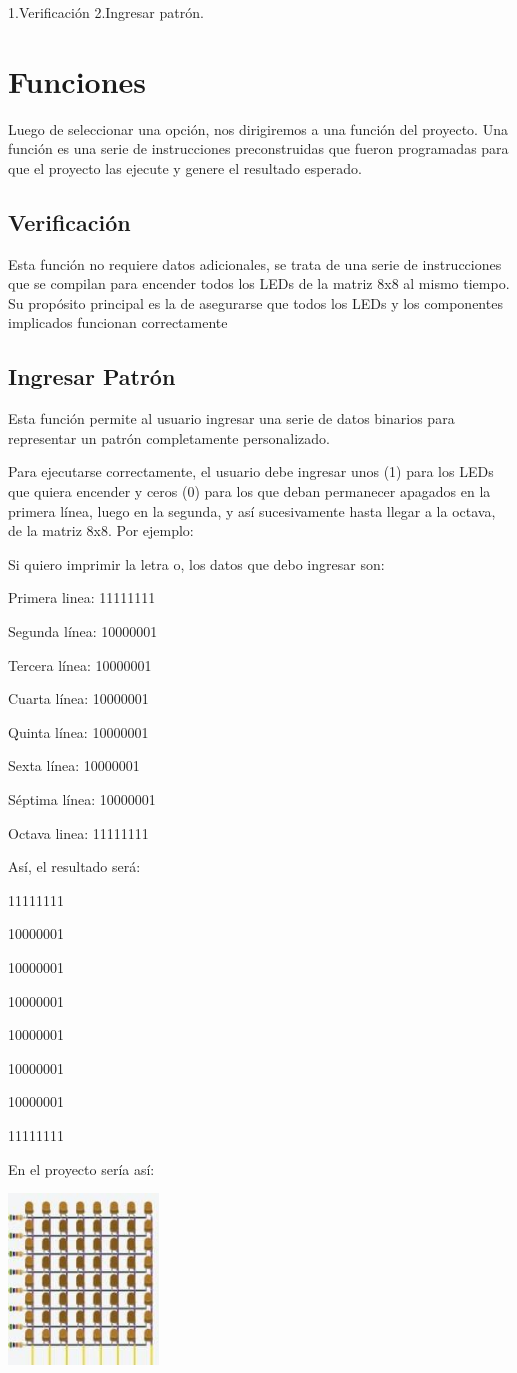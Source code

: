\documentclass{article}
\begin{document}
1.Verificación
2.Ingresar patrón.



\section{Funciones} \label{contenido}
Luego de seleccionar una opción, nos dirigiremos a una función del proyecto. Una función es una serie de instrucciones preconstruidas que fueron programadas para que el proyecto las ejecute y genere el resultado esperado.


\subsection{Verificación}
Esta función no requiere datos adicionales, se trata de una serie de instrucciones que se compilan para encender todos los LEDs de la matriz 8x8 al mismo tiempo. Su propósito principal es la de asegurarse que todos los LEDs y los componentes implicados funcionan correctamente
\subsection{Ingresar Patrón}
Esta función permite al usuario ingresar una serie de datos binarios para representar un patrón completamente personalizado.

Para ejecutarse correctamente, el usuario debe ingresar unos (1) para los LEDs que quiera encender y ceros (0) para los que deban permanecer apagados en la primera línea, luego en la segunda, y así sucesivamente hasta llegar a la octava, de la matriz 8x8. Por ejemplo:

Si quiero imprimir la letra o, los datos que debo ingresar son:

Primera linea: 11111111

Segunda línea: 10000001

Tercera línea: 10000001

Cuarta línea: 10000001

Quinta línea: 10000001

Sexta línea: 10000001

Séptima línea: 10000001


Octava linea: 11111111

Así, el resultado será:


11111111

10000001

10000001

10000001

10000001

10000001

10000001

11111111

En el proyecto sería así:


\includegraphics[width=4cm]{manual.jpeg}
\end{document}

